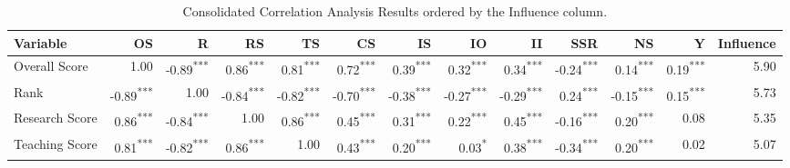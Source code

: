 \documentclass[conference]{IEEEtran}
\begin{document}
\begin{table*}[h!]
	\centering
	\caption{Consolidated Correlation Analysis Results ordered by the Influence column.}
	
	\label{tab:correlation_combined}
	\scriptsize
	\begin{tabular}{|l|r|r|r|r|r|r|r|r|r|r|r|r|}
		\hline
		\textbf{Variable} & \textbf{OS} & \textbf{R} & \textbf{RS} & \textbf{TS} & \textbf{CS} & \textbf{IS} & \textbf{IO} & \textbf{II} & \textbf{SSR} & \textbf{NS} & \textbf{Y} & \textbf{Influence} \\
		\hline
		
		Overall Score & \cellcolor{gray!50}1.00 & \cellcolor{gray!44}-0.89\textsuperscript{***} & \cellcolor{gray!42}0.86\textsuperscript{***} & \cellcolor{gray!40}0.81\textsuperscript{***} & \cellcolor{gray!35}0.72\textsuperscript{***} & \cellcolor{gray!19}0.39\textsuperscript{***} & \cellcolor{gray!16}0.32\textsuperscript{***} & \cellcolor{gray!17}0.34\textsuperscript{***} & \cellcolor{gray!12}-0.24\textsuperscript{***} & \cellcolor{gray!07}0.14\textsuperscript{***} & \cellcolor{gray!09}0.19\textsuperscript{***} & 5.90 \\
		
		Rank & \cellcolor{gray!44}-0.89\textsuperscript{***} & \cellcolor{gray!50}1.00 & \cellcolor{gray!42}-0.84\textsuperscript{***} & \cellcolor{gray!41}-0.82\textsuperscript{***} & \cellcolor{gray!35}-0.70\textsuperscript{***} & \cellcolor{gray!19}-0.38\textsuperscript{***} & \cellcolor{gray!13}-0.27\textsuperscript{***} & \cellcolor{gray!14}-0.29\textsuperscript{***} & \cellcolor{gray!12}0.24\textsuperscript{***} & \cellcolor{gray!08}-0.15\textsuperscript{***} & \cellcolor{gray!08}0.15\textsuperscript{***} & 5.73 \\
		
		Research Score & \cellcolor{gray!42}0.86\textsuperscript{***} & \cellcolor{gray!42}-0.84\textsuperscript{***} & \cellcolor{gray!50}1.00 & \cellcolor{gray!42}0.86\textsuperscript{***} & \cellcolor{gray!22}0.45\textsuperscript{***} & \cellcolor{gray!16}0.31\textsuperscript{***} & \cellcolor{gray!11}0.22\textsuperscript{***} & \cellcolor{gray!22}0.45\textsuperscript{***} & \cellcolor{gray!08}-0.16\textsuperscript{***} & \cellcolor{gray!10}0.20\textsuperscript{***} & \cellcolor{gray!04}0.08 & 5.35 \\
		
		Teaching Score & \cellcolor{gray!40}0.81\textsuperscript{***} & \cellcolor{gray!41}-0.82\textsuperscript{***} & \cellcolor{gray!42}0.86\textsuperscript{***} & \cellcolor{gray!50}1.00 & \cellcolor{gray!21}0.43\textsuperscript{***} & \cellcolor{gray!10}0.20\textsuperscript{***} & \cellcolor{gray!02}0.03\textsuperscript{*} & \cellcolor{gray!19}0.38\textsuperscript{***} & \cellcolor{gray!17}-0.34\textsuperscript{***} & \cellcolor{gray!10}0.20\textsuperscript{***} & \cellcolor{gray!01}0.02 & 5.07 \\
		

\end{tabular}
\end{table*}
\end{document}
